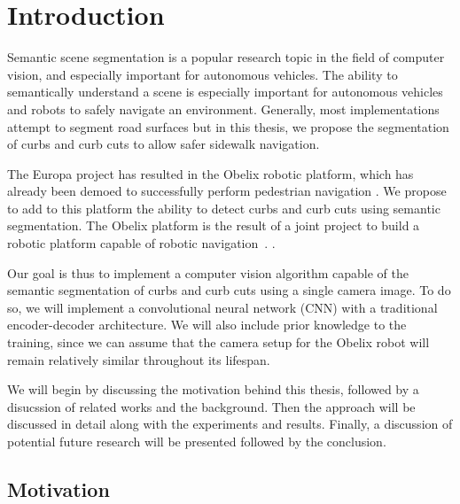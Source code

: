 \chapter{Introduction}\label{chap:introduction}
Semantic scene segmentation is a popular research topic in the field of computer vision, and especially important for autonomous vehicles.
The ability to semantically understand a scene is especially important for autonomous vehicles and robots to safely navigate an environment.
Generally, most implementations attempt to segment road surfaces but in this thesis, we propose the segmentation of curbs and curb cuts to allow safer sidewalk navigation.

The Europa project has resulted in the Obelix robotic platform, which has already been demoed to successfully perform pedestrian navigation \cite{europa}\cite{obelix-slam}.
We propose to add to this platform the ability to detect curbs and curb cuts using semantic segmentation.
The Obelix platform is the result of a joint project to build a robotic platform capable of robotic navigation~\cite{europa}. .

Our goal is thus to implement a computer vision algorithm capable of the semantic segmentation of curbs and curb cuts using a single camera image.
To do so, we will implement a convolutional neural network (CNN) with a traditional encoder-decoder architecture.
We will also include prior knowledge to the training, since we can assume that the camera setup for the Obelix robot will remain relatively similar throughout its lifespan.

We will begin by discussing the motivation behind this thesis, followed by a disucssion of related works and the background.
Then the approach will be discussed in detail along with the experiments and results.
Finally, a discussion of potential future research will be presented followed by the conclusion.

\section{Motivation}\label{section:introduction-motivation}

